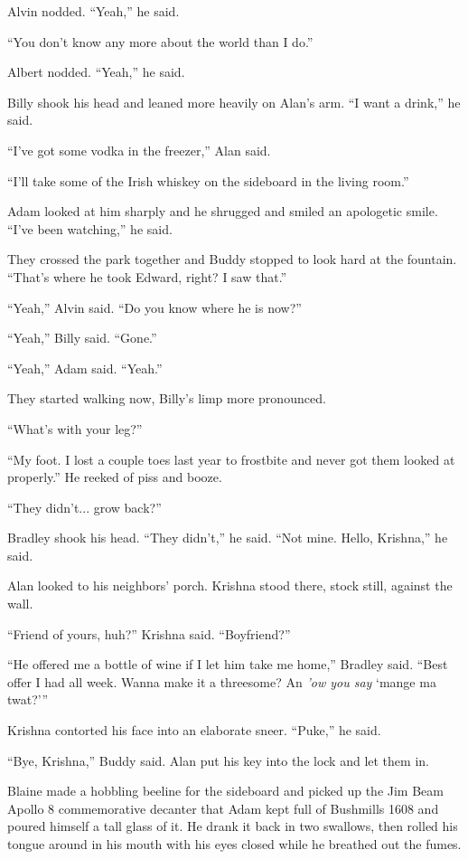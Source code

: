 Alvin nodded.  ``Yeah,'' he said.

``You don't know any more about the world than I do.''

Albert nodded.  ``Yeah,'' he said.

Billy shook his head and leaned more heavily on Alan's arm.  ``I want
a drink,'' he said.

``I've got some vodka in the freezer,'' Alan said.

``I'll take some of the Irish whiskey on the sideboard in the living
room.''

Adam looked at him sharply and he shrugged and smiled an apologetic
smile.  ``I've been watching,'' he said.

They crossed the park together and Buddy stopped to look hard at the
fountain.  ``That's where he took Edward, right?  I saw that.''

``Yeah,'' Alvin said.  ``Do you know where he is now?''

``Yeah,'' Billy said.  ``Gone.''

``Yeah,'' Adam said.  ``Yeah.''

They started walking now, Billy's limp more pronounced.

``What's with your leg?''

``My foot.  I lost a couple toes last year to frostbite and never got
them looked at properly.'' He reeked of piss and booze.

``They didn't...  grow back?''

Bradley shook his head.  ``They didn't,'' he said.  ``Not mine. 
Hello, Krishna,'' he said.

Alan looked to his neighbors' porch.  Krishna stood there, stock
still, against the wall.

``Friend of yours, huh?'' Krishna said.  ``Boyfriend?''

``He offered me a bottle of wine if I let him take me home,'' Bradley
said.  ``Best offer I had all week.  Wanna make it a threesome?  An
\textit{'ow you say} `mange ma twat?'''

Krishna contorted his face into an elaborate sneer.  ``Puke,'' he
said.

``Bye, Krishna,'' Buddy said.  Alan put his key into the lock and let
them in.

Blaine made a hobbling beeline for the sideboard and picked up the Jim
Beam Apollo 8 commemorative decanter that Adam kept full of Bushmills
1608 and poured himself a tall glass of it.  He drank it back in two
swallows, then rolled his tongue around in his mouth with his eyes
closed while he breathed out the fumes.


